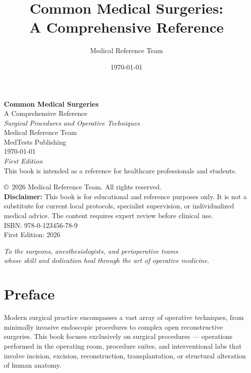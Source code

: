 \documentclass[12pt,oneside]{book}
\title{Common Medical Surgeries:\\ A Comprehensive Reference}
\author{Medical Reference Team}
\date{\today}
\begin{document}
\frontmatter

\begin{titlepage}
    \centering
    \vspace*{2cm}
    {\Huge \bfseries Common Medical Surgeries}\\[0.5cm]
    {\Large A Comprehensive Reference}\\[1.5cm]
    {\large \textit{Surgical Procedures and Operative Techniques}}\\[2cm]
    {\large Medical Reference Team}\\[0.5cm]
    {\normalsize MedTests Publishing}\\[1cm]
    {\today}\\[2cm]
    {\small \textit{First Edition}}\\
    \vfill
    {\footnotesize This book is intended as a reference for healthcare professionals and students.}
\end{titlepage}

\newpage
\thispagestyle{empty}
\vspace*{\fill}
\noindent \copyright\ 2026 Medical Reference Team. All rights reserved.\\[0.5cm]
\textbf{Disclaimer:} This book is for educational and reference purposes only. It is not a substitute for current local protocols, specialist supervision, or individualized medical advice. The content requires expert review before clinical use.\\[0.5cm]
ISBN: 978-0-123456-78-9\\[0.5cm]
First Edition: 2026

\newpage
\thispagestyle{empty}
\vspace*{\fill}
\begin{center}
    \textit{To the surgeons, anesthesiologists, and perioperative teams\\
    whose skill and dedication heal through the art of operative medicine.}
\end{center}
\vspace*{\fill}

\chapter*{Preface}

Modern surgical practice encompasses a vast array of operative techniques, from minimally invasive endoscopic procedures to complex open reconstructive surgeries. This book focuses exclusively on surgical procedures --- operations performed in the operating room, procedure suites, and interventional labs that involve incision, excision, reconstruction, transplantation, or structural alteration of human anatomy.
\end{document}
